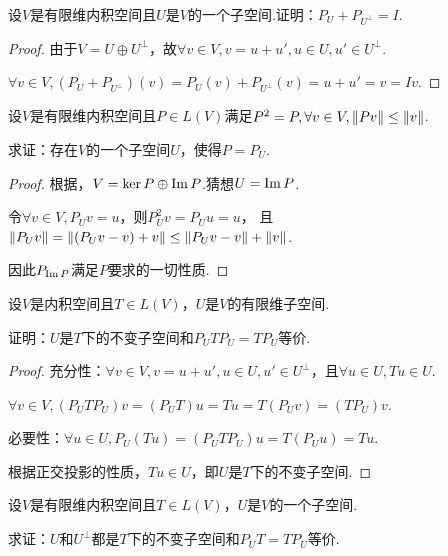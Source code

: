 \begin{problem}[5]\label{6.C.5}
    设\(V\)是有限维内积空间且\(U\)是\(V\)的一个子空间.证明：\(P_U+P_{U^\bot}=I\).
\end{problem}

\begin{proof}
    由于\(V=U \oplus U^\bot\)，故\(\forall v \in V,v=u+u',u \in U,u' \in U^\bot\).

    \(\forall v \in V,(P_U+P_{U^\bot})(v)=P_U(v)+P_{U^\bot}(v)=u+u'=v=Iv\).
\end{proof}

\begin{problem}[8]\label{6.C.8}
    设\(V\)是有限维内积空间且\(P \in L(V)\)满足\(P^2=P,\forall v \in V,\norm*{Pv} \leq \norm*{v}\).

    求证：存在\(V\)的一个子空间\(U\)，使得\(P=P_U\).
\end{problem}

\begin{proof}
    根据，\(V= \ker P \oplus \Img P\).猜想\(U=\Img P\).

    令\(\forall v \in V,P_U v=u\)，则\(P_U^2 v=P_U u=u\)，
    且\(\norm*{P_U v}=\norm*{(P_U v-v)+v} \leq \norm*{P_U v-v}+\norm*{v}\).
    
    因此\(P_{\Img P}\)满足\(P\)要求的一切性质.
\end{proof}

\begin{problem}[9]\label{6.C.9}
    设\(V\)是内积空间且\(T \in L(V)\)，\(U\)是\(V\)的有限维子空间.

    证明：\(U\)是\(T\)下的不变子空间和\(P_U T P_U=T P_U\)等价.
\end{problem}

\begin{proof}
    充分性：\(\forall v \in V,v=u+u',u \in U,u' \in U^\bot\)，且\(\forall u \in U,Tu \in U\).

    \(\forall v \in V,(P_U T P_U)v=(P_U T)u=Tu=T(P_U v)=(T P_U)v\).
    
    必要性：\(\forall u \in U,P_U(Tu)=(P_U T P_U)u=T(P_U u)=Tu\).
    
    根据正交投影的性质，\(Tu \in U\)，即\(U\)是\(T\)下的不变子空间.
\end{proof}

\newpage

\begin{problem}[10]\label{6.C.10}
    设\(V\)是有限维内积空间且\(T \in L(V)\)，\(U\)是\(V\)的一个子空间.

    求证：\(U\)和\(U^\bot\)都是\(T\)下的不变子空间和\(P_U T=T P_U\)等价.
\end{problem}

